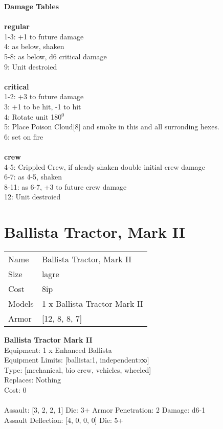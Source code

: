{\bf Damage Tables} \\
\ \\ {\bf regular } \\
1-3: +1 to future damage \\
4: as below, shaken \\
5-8: as below, d6 critical damage \\
9: Unit destroied \\
\ \\ {\bf critical } \\
1-2: +3 to future damage \\
3: +1 to be hit, -1 to hit \\
4: Rotate unit 180$^0$ \\
5: Place Poison Cloud[8] and smoke in this and all surronding hexes. \\
6: set on fire \\
\ \\ {\bf crew } \\
4-5: Crippled Crew, if aleady shaken double initial crew damage \\
6-7: as 4-5, shaken \\
8-11: as 6-7, +3 to future crew damage \\
12: Unit destroied \\










\pagebreak\pagebreak

\section{ Ballista Tractor, Mark II }

\begin{tabular}{ll}
  Name & Ballista Tractor, Mark II \\
  Size & lagre\\
  Cost & 8ip\\
  Models & 1 x Ballista Tractor Mark II\\
  Armor & [12, 8, 8, 7]\\
\end{tabular}

\noindent 

{\bf Ballista Tractor Mark II } \\
Equipment: 1 x Enhanced Ballista \\
Equipment Limits: [ballista:1, independent:∞] \\
Type: [mechanical, bio crew, vehicles, wheeled] \\
Replaces: Nothing \\
Cost: 0\\
\ \\
Assault: [3, 2, 2, 1] Die: 3+ Armor Penetration: 2 Damage: d6-1 \\
Assault Deflection: [4, 0, 0, 0] Die: 5+\\
\indent  
\ \\


